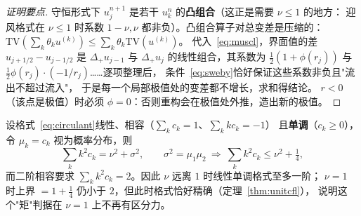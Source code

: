 \begin{proof}[证明要点]
守恒形式下 $u_j^{n+1}$ 是若干 $u_k^n$ 的\textbf{凸组合}（这正是需要 $\nu\le1$ 的地方：
迎风格式在 $\nu\le1$ 时系数 $1-\nu,\nu$ 都非负）。凸组合算子对总变差是压缩的：
$\mathrm{TV}(\sum_k\theta_k u^{(k)})\le\sum_k\theta_k\mathrm{TV}(u^{(k)})$。
代入~\eqref{eq:muscl}，界面值的差 $u_{j+1/2}-u_{j-1/2}$ 是
$\Delta_+u_{j-1}$ 与 $\Delta_+u_j$ 的线性组合，其系数为
$\tfrac12(1+\phi(r_j))$ 与 $\tfrac12\phi(r_j)\cdot(-1/r_j)$……逐项整理后，
条件~\eqref{eq:sweby}恰好保证这些系数非负且"流出不超过流入"，
于是每一个局部极值处的变差都不增长，求和得结论。
$r<0$（该点是极值）时必须 $\phi=0$：否则重构会在极值处外推，造出新的极值。
\end{proof}

\begin{theorem}[Godunov 定理]
\label{thm:godunov}
设格式~\eqref{eq:circulant}线性、相容（$\sum_kc_k=1$、$\sum_kkc_k=-1$）
且\textbf{单调}（$c_k\ge0$），令 $\mu_k=c_k$ 视为概率分布，则
\begin{equation}
  \sum_k k^2c_k=\nu^2+\sigma^2,\qquad \sigma^2=\mu_1\mu_2\ \Longrightarrow\
  \sum_k k^2c_k\le\nu^2+\tfrac14 ,
  \label{eq:godunov}
\end{equation}
而二阶相容要求 $\sum_kk^2c_k=2$。因此 $\nu$ 远离 $1$ 时线性单调格式至多一阶；
$\nu=1$ 时上界 $=1+\tfrac14$ 仍小于 $2$，但此时格式恰好精确（定理~\ref{thm:unitcfl}），
说明这个"矩"判据在 $\nu=1$ 上不再有区分力。
\end{theorem}

